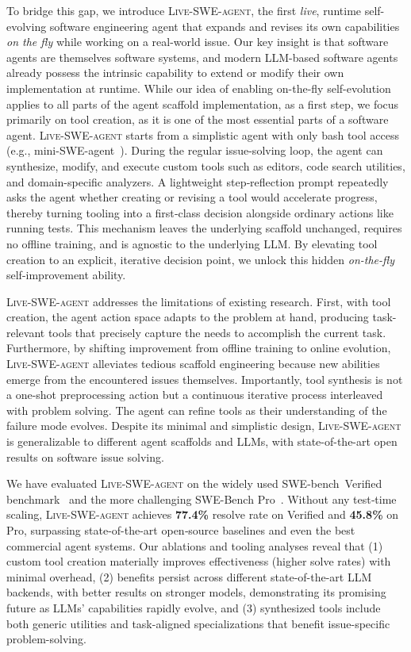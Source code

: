 \documentclass{article}
\newcommand{\tech}{\textsc{Live-SWE-agent}\xspace}
\renewcommand{\cite}{\citep}
\newcommand{\livesweagent}{\textsc{Live-SWE-agent}\xspace}
\newcommand{\sbv}{SWE-bench~Verified\xspace}
\newcommand{\swebenchpro}{SWE-Bench Pro\xspace}
\newcommand{\llm}{LLM\xspace}
\begin{document}
To bridge this gap,
we introduce \livesweagent, the first
\emph{live}, runtime self-evolving software engineering agent that expands and
revises its own capabilities \emph{on the fly} while working on a real-world issue.
Our key insight is that software agents are themselves software systems, and modern LLM-based software agents already possess the intrinsic capability to extend or modify their own implementation at runtime.
{While our idea of enabling on-the-fly self-evolution applies to all parts of the agent scaffold implementation, as a first step, we focus primarily on tool creation, as it is one of the most essential parts of a software agent.}
{\tech} starts from a simplistic agent with only bash tool access (e.g., mini-SWE-agent~\cite{yang2024sweagent}).
During {the} regular issue-solving loop, {the agent} can synthesize, modify, and execute custom tools such as editors, code search utilities, and domain-specific analyzers.
A lightweight step‑reflection prompt repeatedly asks the agent whether creating or revising a tool would accelerate progress, thereby turning tooling into a first‑class decision alongside ordinary actions like running tests.
This mechanism leaves the underlying scaffold unchanged, requires no offline training, and is agnostic to the underlying LLM.
By elevating tool creation to an explicit, iterative decision point, we unlock this hidden \emph{on-the-fly} self-improvement ability.

\livesweagent addresses the limitations of existing research.
First, with tool creation, the agent action space adapts to the problem at hand, producing task-relevant tools that precisely capture the needs to accomplish the current task.
Furthermore, by shifting improvement from offline training to online evolution, \livesweagent alleviates tedious scaffold engineering because new abilities emerge from the encountered issues themselves.
Importantly, tool synthesis is not a one-shot preprocessing action but a continuous iterative process interleaved with problem solving. The agent can refine tools as their understanding of the failure mode evolves.
Despite its minimal and simplistic design, \livesweagent is generalizable to different agent scaffolds and LLMs, with state-of-the-art open results on software issue solving.

We have evaluated \livesweagent on the widely used \sbv benchmark~\cite{sbv} and the more challenging \swebenchpro~\cite{deng2025swe}. Without any test‑time scaling, \livesweagent achieves \textbf{77.4\%} resolve rate on Verified and \textbf{45.8\%} on Pro, surpassing state-of-the-art open‑source baselines and{ even} the best commercial agent systems.
Our ablations and tooling analyses reveal that (1) custom tool creation materially improves effectiveness (higher solve rates) with minimal overhead,
(2) benefits persist across different state-of-the-art \llm backends, with better results on stronger models, demonstrating its promising future as LLMs' capabilities rapidly evolve,
and (3) synthesized tools include both generic utilities and task-aligned specializations that benefit issue-specific problem-solving.
\end{document}
